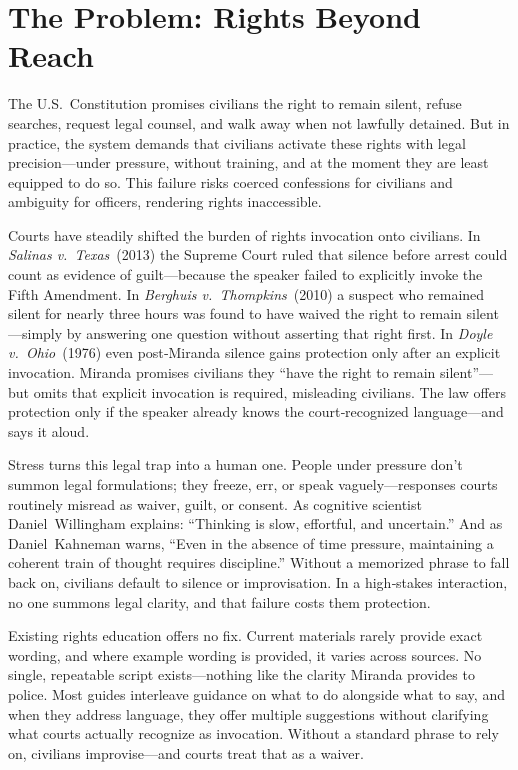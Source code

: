 \section{The Problem: Rights Beyond Reach}

The U.S.\ Constitution promises civilians the right to remain silent, refuse searches, request legal counsel, and walk away when not lawfully detained. But in practice, the system demands that civilians activate these rights with legal precision—under pressure, without training, and at the moment they are least equipped to do so. This failure risks coerced confessions for civilians and ambiguity for officers, rendering rights inaccessible.

Courts have steadily shifted the burden of rights invocation onto civilians. In \textit{Salinas v.\ Texas} (2013) the Supreme Court ruled that silence before arrest could count as evidence of guilt—because the speaker failed to explicitly invoke the Fifth Amendment. In \textit{Berghuis v.\ Thompkins} (2010) a suspect who remained silent for nearly three hours was found to have waived the right to remain silent—simply by answering one question without asserting that right first. In \textit{Doyle v.\ Ohio} (1976) even post‑Miranda silence gains protection only after an explicit invocation. Miranda promises civilians they ``have the right to remain silent''—but omits that explicit invocation is required, misleading civilians. The law offers protection only if the speaker already knows the court‑recognized language—and says it aloud.

Stress turns this legal trap into a human one. People under pressure don’t summon legal formulations; they freeze, err, or speak vaguely—responses courts routinely misread as waiver, guilt, or consent. As cognitive scientist Daniel Willingham explains: ``Thinking is slow, effortful, and uncertain.'' And as Daniel Kahneman warns, ``Even in the absence of time pressure, maintaining a coherent train of thought requires discipline.'' Without a memorized phrase to fall back on, civilians default to silence or improvisation. In a high‑stakes interaction, no one summons legal clarity, and that failure costs them protection.

Existing rights education offers no fix. Current materials rarely provide exact wording, and where example wording is provided, it varies across sources. No single, repeatable script exists—nothing like the clarity Miranda provides to police. Most guides interleave guidance on what to do alongside what to say, and when they address language, they offer multiple suggestions without clarifying what courts actually recognize as invocation. Without a standard phrase to rely on, civilians improvise—and courts treat that as a waiver.


